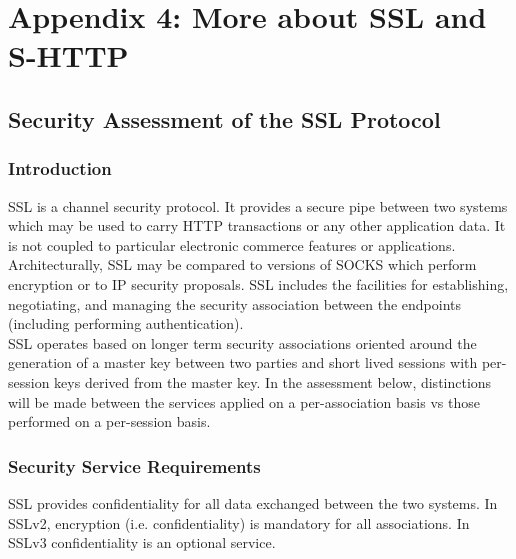 \chapter{Appendix 4: More about SSL and S-HTTP}

\section{Security Assessment of the SSL Protocol}

\subsection{Introduction}

SSL is a channel security protocol. It provides a secure pipe between
two systems which may be used to carry HTTP transactions or any other
application data. It is not coupled to particular electronic commerce
features or applications. Architecturally, SSL may be compared to
versions of SOCKS which perform encryption or to IP security proposals.
SSL includes the facilities for establishing, negotiating, and managing
the security association between the endpoints (including performing
authentication).\\

SSL operates based on longer term security associations oriented around
the generation of a master key between two parties and short lived
sessions with per-session keys derived from the master key. In the
assessment below, distinctions will be made between the services
applied on a per-association basis vs those performed on a per-session
basis.

\subsection{Security Service Requirements}


  
  SSL provides confidentiality for all data exchanged between the two
  systems. In SSLv2, encryption (i.e. confidentiality) is mandatory for all
  associations. In SSLv3 confidentiality is an optional service.

